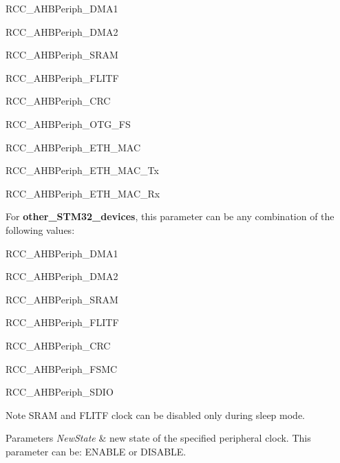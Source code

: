 \begin{DoxyItemize}
\item R\+C\+C\+\_\+\+A\+H\+B\+Periph\+\_\+\+D\+M\+A1 \item R\+C\+C\+\_\+\+A\+H\+B\+Periph\+\_\+\+D\+M\+A2 \item R\+C\+C\+\_\+\+A\+H\+B\+Periph\+\_\+\+S\+R\+AM \item R\+C\+C\+\_\+\+A\+H\+B\+Periph\+\_\+\+F\+L\+I\+TF \item R\+C\+C\+\_\+\+A\+H\+B\+Periph\+\_\+\+C\+RC \item R\+C\+C\+\_\+\+A\+H\+B\+Periph\+\_\+\+O\+T\+G\+\_\+\+FS\end{DoxyItemize}
\begin{DoxyItemize}
\item R\+C\+C\+\_\+\+A\+H\+B\+Periph\+\_\+\+E\+T\+H\+\_\+\+M\+AC\end{DoxyItemize}
\begin{DoxyItemize}
\item R\+C\+C\+\_\+\+A\+H\+B\+Periph\+\_\+\+E\+T\+H\+\_\+\+M\+A\+C\+\_\+\+Tx \item R\+C\+C\+\_\+\+A\+H\+B\+Periph\+\_\+\+E\+T\+H\+\_\+\+M\+A\+C\+\_\+\+Rx\end{DoxyItemize}
For {\bfseries{other\+\_\+\+S\+T\+M32\+\_\+devices}}, this parameter can be any combination of the following values\+:

\begin{DoxyItemize}
\item R\+C\+C\+\_\+\+A\+H\+B\+Periph\+\_\+\+D\+M\+A1 \item R\+C\+C\+\_\+\+A\+H\+B\+Periph\+\_\+\+D\+M\+A2 \item R\+C\+C\+\_\+\+A\+H\+B\+Periph\+\_\+\+S\+R\+AM \item R\+C\+C\+\_\+\+A\+H\+B\+Periph\+\_\+\+F\+L\+I\+TF \item R\+C\+C\+\_\+\+A\+H\+B\+Periph\+\_\+\+C\+RC \item R\+C\+C\+\_\+\+A\+H\+B\+Periph\+\_\+\+F\+S\+MC \item R\+C\+C\+\_\+\+A\+H\+B\+Periph\+\_\+\+S\+D\+IO\end{DoxyItemize}
\begin{DoxyNote}{Note}
S\+R\+AM and F\+L\+I\+TF clock can be disabled only during sleep mode. 
\end{DoxyNote}

\begin{DoxyParams}{Parameters}
{\em New\+State} & new state of the specified peripheral clock. This parameter can be\+: E\+N\+A\+B\+LE or D\+I\+S\+A\+B\+LE. \\
\hline
\end{DoxyParams}

